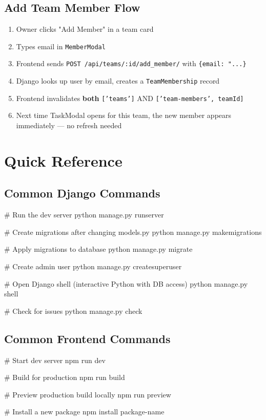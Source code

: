 \documentclass[12pt,a4paper]{article}
\begin{document}
\subsection{Add Team Member Flow}
\begin{enumerate}
    \item Owner clicks "Add Member" in a team card
    \item Types email in \texttt{MemberModal}
    \item Frontend sends \texttt{POST /api/teams/:id/add\_member/} with \texttt{\{email: "...\}}
    \item Django looks up user by email, creates a \texttt{TeamMembership} record
    \item Frontend invalidates \textbf{both} \texttt{['teams']} AND \texttt{['team-members', teamId]}
    \item Next time TaskModal opens for this team, the new member appears immediately — no refresh needed
\end{enumerate}


\section{Quick Reference}

\subsection{Common Django Commands}
\begin{termbox}
# Run the dev server
python manage.py runserver

# Create migrations after changing models.py
python manage.py makemigrations

# Apply migrations to database
python manage.py migrate

# Create admin user
python manage.py createsuperuser

# Open Django shell (interactive Python with DB access)
python manage.py shell

# Check for issues
python manage.py check
\end{termbox}

\subsection{Common Frontend Commands}
\begin{termbox}
# Start dev server
npm run dev

# Build for production
npm run build

# Preview production build locally
npm run preview

# Install a new package
npm install package-name
\end{termbox}
\end{document}
